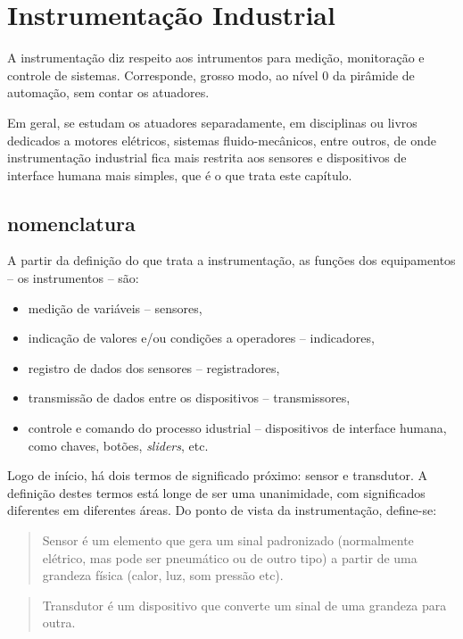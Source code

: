 \chapter{Instrumentação Industrial}

A instrumentação diz respeito aos intrumentos para medição, monitoração e controle de sistemas. Corresponde, grosso modo, ao nível 0 da pirâmide de automação, sem contar os atuadores.

Em geral, se estudam os atuadores separadamente, em disciplinas ou livros dedicados a motores elétricos, sistemas fluido-mecânicos, entre outros, de onde instrumentação industrial fica mais restrita aos sensores e dispositivos de interface humana mais simples, que é o que trata este capítulo. 
\section{nomenclatura}

A partir da definição do que trata a instrumentação, as funções dos equipamentos -- os instrumentos --  são: 
\begin{itemize}
  \item medição de variáveis -- sensores,
  \item indicação de valores e/ou condições a operadores -- indicadores,
  \item registro de dados dos sensores -- registradores, 
  \item transmissão de dados entre os dispositivos -- transmissores, 
  \item controle e comando do processo idustrial -- dispositivos de interface humana, como chaves, botões, \emph{sliders}, etc.
\end{itemize} 

Logo de início, há dois termos de significado próximo: sensor e transdutor. A definição destes termos está longe de ser uma unanimidade, com significados diferentes em diferentes áreas. Do ponto de vista da instrumentação, define-se:

\begin{quote}
  Sensor é um elemento que gera um sinal padronizado (normalmente elétrico, mas pode ser pneumático ou de outro tipo) a partir de uma grandeza física (calor, luz, som pressão etc).
\end{quote}
\begin{quote}
  Transdutor é um dispositivo que converte um sinal de uma grandeza para outra.
\end{quote}

